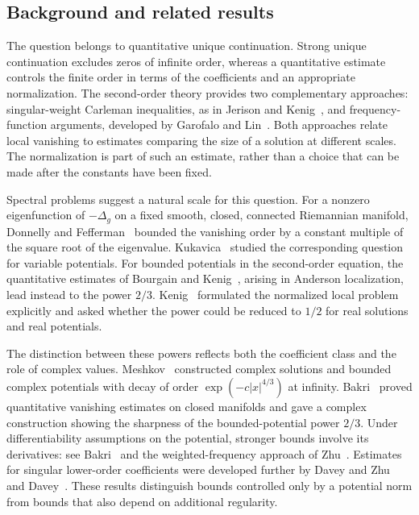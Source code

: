 \documentclass[11pt,twoside,leqno]{article}
\numberwithin{equation}{section}
\theoremstyle{definition}
\theoremstyle{remark}
\begin{document}
\subsection{Background and related results}

The question belongs to quantitative unique continuation. Strong unique
continuation excludes zeros of infinite order, whereas a quantitative
estimate controls the finite order in terms of the coefficients and an
appropriate normalization. The second-order theory provides two
complementary approaches: singular-weight Carleman inequalities, as in
Jerison and Kenig~\cite{JK}, and frequency-function arguments, developed
by Garofalo and Lin~\cite{GL86,GL87}. Both approaches relate local
vanishing to estimates comparing the size of a solution at different
scales. The normalization is part of such an estimate, rather than a
choice that can be made after the constants have been fixed.

Spectral problems suggest a natural scale for this question. For a
nonzero eigenfunction of $-\Delta_g$ on a fixed smooth, closed,
connected Riemannian manifold, Donnelly and Fefferman~\cite{DF}
bounded the vanishing order by a constant multiple of the square root
of the eigenvalue. Kukavica~\cite{Kuk} studied the corresponding
question for variable potentials. For bounded potentials in the
second-order equation, the quantitative estimates of Bourgain and
Kenig~\cite{BK}, arising in Anderson localization, lead instead to the
power $2/3$. Kenig~\cite[p.~XX--4]{Kenig} formulated the normalized
local problem explicitly and asked whether the power could be reduced
to $1/2$ for real solutions and real potentials.

The distinction between these powers reflects both the coefficient
class and the role of complex values. Meshkov~\cite{Meshkov}
constructed complex solutions and bounded complex potentials with decay
of order $\exp(-c|x|^{4/3})$ at infinity. Bakri~\cite{Bakri}
proved quantitative vanishing estimates on closed manifolds and gave a
complex construction showing the sharpness of the bounded-potential
power $2/3$. Under differentiability assumptions on the potential,
stronger bounds involve its derivatives: see Bakri~\cite{Bakri12}
and the weighted-frequency approach of Zhu~\cite{Zhu16}. Estimates
for singular lower-order coefficients were developed further by Davey
and Zhu~\cite{DZ} and Davey~\cite{Davey}. These results distinguish
bounds controlled only by a potential norm from bounds that also depend
on additional regularity.
\end{document}
